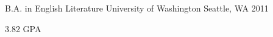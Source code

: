 


\begin{cventries}


\cventry
{B.A. in English Literature} %
{University of Washington} %
{Seattle, WA} %
{2011} %
{ %
\begin{cvitems}
\item {3.82 GPA}
\end{cvitems}
}


\end{cventries}
